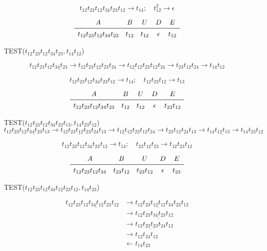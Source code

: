 \documentclass[worked-example]{subfiles}
\begin{document}
\[
t_{12} t_{23} t_{12} t_{34} t_{23} t_{12} \rightarrow t_{14}; \quad
t_{12}^2 \rightarrow \epsilon
\]

\[
\begin{array}{ccccc}
A & B & U & D & E \\
\midrule
t_{12} t_{23} t_{12} t_{34} t_{23} & t_{12} & t_{12} & \epsilon  & t_{12}\\
\end{array}
\]

TEST($t_{12} t_{23} t_{12} t_{34} t_{23}, t_{14}t_{12}$)

\[ 
t_{12} t_{23} t_{12} \underline{t_{34} t_{23}} \rightarrow
t_{12} \underline{t_{23} t_{12} t_{23}} t_{24} \rightarrow
\underline{t_{12} t_{12}} t_{23} t_{12} t_{24} \rightarrow t_{23} t_{12} t_{24} \rightarrow t_{14}t_{12}
\]

\[
t_{12} t_{23} t_{12} t_{34} t_{23} t_{12} \rightarrow t_{14}; \quad
t_{12} t_{23} t_{12} \rightarrow t_{13}
\]

\[
\begin{array}{ccccc}
A & B & U & D & E \\
\midrule
t_{12} t_{23} t_{12} t_{34} t_{23} & t_{12} & t_{12} & \epsilon  & t_{23} t_{12}\\
\end{array}
\]

TEST($t_{12} t_{23} t_{12} t_{34} t_{23} t_{13}, t_{14}t_{23} t_{12}$)
\[ 
t_{12} t_{23} t_{12} \underline{t_{34} t_{23}} t_{13} \rightarrow
t_{12} \underline{t_{23} t_{12} t_{23}} t_{24} t_{13} \rightarrow
\underline{t_{12} t_{12}} t_{23} t_{12} t_{24} \rightarrow t_{23} t_{12} t_{24} t_{13} \rightarrow 
t_{14}\underline{t_{12} t_{13}} \rightarrow t_{14}t_{23} t_{12}
\]

\[
t_{12} t_{23} t_{12} t_{34} t_{23} t_{12} \rightarrow t_{14}; \quad
t_{23} t_{12} t_{23} \rightarrow t_{12} t_{23} t_{12}
\]

\[
\begin{array}{ccccc}
A & B & U & D & E \\
\midrule
t_{12} t_{23} t_{12} t_{34}  & t_{23}t_{12} & t_{23}t_{12} & \epsilon  & t_{23}\\
\end{array}
\]

TEST($t_{12} t_{23} t_{12} t_{34} t_{12} t_{23} t_{12}, t_{14}t_{23}$)

\begin{align*}
t_{12} t_{23} t_{12} \underline{t_{34} t_{12}} t_{23} t_{12} 
&\rightarrow t_{12} t_{23} \underline{t_{12} t_{12}} t_{34} t_{23} t_{12} \\
&\rightarrow t_{12} t_{23} \underline{t_{34} t_{23}} t_{12} \\
&\rightarrow t_{12} \underline{t_{23} t_{23}} t_{24} t_{12} \\
&\rightarrow t_{12} t_{24} t_{12} \\
&\leftarrow t_{14}t_{23}
\end{align*}
\end{document}
